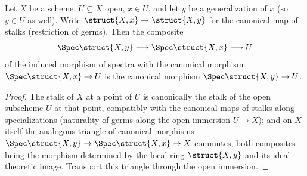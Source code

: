 \begin{lemma}
  \label{lem:fromSpecStalkOfMem_stalkSpecializes}
  \leanok
  Let \(X\) be a scheme, \(U \subseteq X\) open, \(x \in U\), and let \(y\) be a
  generalization of \(x\) (so \(y \in U\) as well). Write
  \(\struct{X,x} \to \struct{X,y}\) for the canonical map of stalks (restriction of
  germs). Then the composite
  \[
    \Spec \struct{X,y} \longrightarrow \Spec \struct{X,x} \longrightarrow U
  \]
  of the induced morphism of spectra with the canonical morphism
  \(\Spec \struct{X,x} \to U\) is the canonical morphism \(\Spec \struct{X,y} \to U\).
\end{lemma}
\begin{proof}
  \leanok
  The stalk of \(X\) at a point of \(U\) is canonically the stalk of the open subscheme
  \(U\) at that point, compatibly with the canonical maps of stalks along
  specializations (naturality of germs along the open immersion \(U \to X\)); and on
  \(X\) itself the analogous triangle of canonical morphisms
  \(\Spec \struct{X,y} \to \Spec \struct{X,x} \to X\) commutes, both composites being the
  morphism determined by the local ring \(\struct{X,y}\) and its ideal-theoretic image.
  Transport this triangle through the open immersion.
\end{proof}

